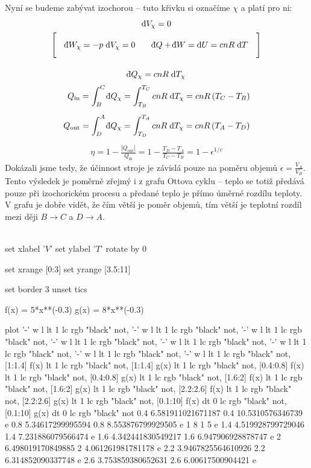 \documentclass{article}
\newcommand{\const}[1]{\text{#1}}
\renewcommand{\d}[1]{\const{d} #1}
\newcommand{\di}[1]{\mathchar22\mkern-11mu \mathrm{d} #1}
\begin{document}
Nyní se budeme zabývat izochorou – tuto křivku si označíme $\chi$ a platí pro ni:
\begin{gather*}
    \d{V}_\chi = 0
    \\
    \Bigg[
    \quad
    \di{W}_\chi = -p \; \d{V}_\chi = 0
    \qquad
    \di{Q} + \di{W}
    = \d{U}
    = cnR \; \d{T}
    \quad
    \Bigg]
    \\[10pt]
    \di{Q}_\chi = cnR \; \d{T}_\chi
\end{gather*}
\begin{align*}
    Q_\const{in}
    &= \int_B^C \di{Q}_\chi
    = \int_{T_B}^{T_C} cnR \; \d{T}_\chi
    = cnR \, (T_C - T_B)
    \\[5pt]
    Q_\const{out}
    &= \int_{D}^{A} \di{Q}_\chi
    = \int_{T_D}^{T_A} cnR \; \d{T}_\chi
    = cnR \, (T_A - T_D)
\end{align*}
\begin{gather*}
    \eta = 1 - \frac{|Q_\const{out}|}{Q_\const{in}}
    = 1 - \frac{T_D - T_A}{T_C - T_B}
    = 1 - \epsilon^{1/c}
\end{gather*}
Dokázali jsme tedy, že účinnost stroje je závislá pouze na poměru objemů $\epsilon = \frac{V_A}{V_B}$. Tento výsledek je poměrně zřejmý i z grafu Ottova cyklu – teplo se totiž předává pouze při izochorickém procesu a předané teplo je přímo úměrné rozdílu teploty. V grafu je dobře vidět, že čím větší je poměr objemů, tím větší je teplotní rozdíl mezi ději $B\to C$ a $D\to A$.
\\\\


\centering
\begin{gnuplot}[terminal=cairolatex, terminaloptions = {size 18cm, 10cm}]
	set xlabel '$V$'
	set ylabel '$T$' rotate by 0
	
	set xrange [0:3]
	set yrange [3.5:11]
	
	set border 3
	unset tics
	
	f(x) = 5*x**(-0.3)
	g(x) = 8*x**(-0.3)
	
	plot '-' w l lt 1 lc rgb "black" not, '-' w l lt 1 lc rgb "black" not, '-' w l lt 1 lc rgb "black" not, '-' w l lt 1 lc rgb "black" not, '-' w l lt 1 lc rgb "black" not, '-' w l lt 1 lc rgb "black" not, '-' w l lt 1 lc rgb "black" not, '-' w l lt 1 lc rgb "black" not, [1:1.4] f(x) lt 1 lc rgb "black" not, [1:1.4] g(x) lt 1 lc rgb "black" not, [0.4:0.8] f(x) lt 1 lc rgb "black" not, [0.4:0.8] g(x) lt 1 lc rgb "black" not, [1.6:2] f(x) lt 1 lc rgb "black" not, [1.6:2] g(x) lt 1 lc rgb "black" not, [2.2:2.6] f(x) lt 1 lc rgb "black" not, [2.2:2.6] g(x) lt 1 lc rgb "black" not, [0.1:10] f(x) dt 0 lc rgb "black" not, [0.1:10] g(x) dt 0 lc rgb "black" not
	0.4 6.581911021671187
	0.4 10.5310576346739
	e
	0.8 5.34617299995594
	0.8 8.553876799929505
	e
	1 8
	1 5
	e
	1.4 4.519928799729046
	1.4 7.231886079566474
	e
	1.6 4.342441830549217
	1.6 6.947906928878747
	e
	2 6.498019170849885
	2 4.061261981781178
	e
	2.2 3.9467825564610926
	2.2 6.314852090337748
	e
	2.6 3.753859380652631
	2.6 6.00617500904421
	e
\end{gnuplot}
\end{document}
